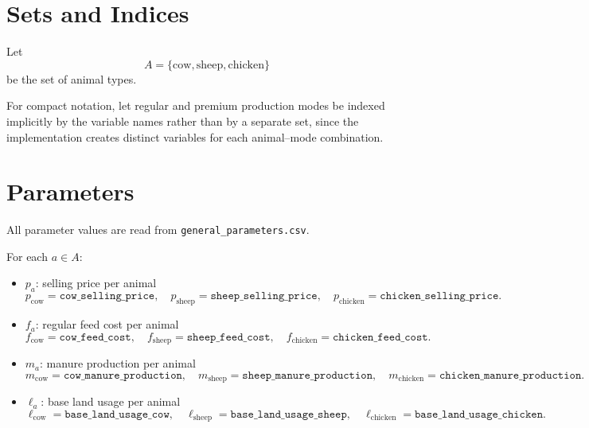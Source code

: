 \section*{Sets and Indices}

Let
\[
A=\{\mathrm{cow},\mathrm{sheep},\mathrm{chicken}\}
\]
be the set of animal types.

For compact notation, let regular and premium production modes be indexed implicitly by the variable names rather than by a separate set, since the implementation creates distinct variables for each animal--mode combination.

\section*{Parameters}

All parameter values are read from \texttt{general\_parameters.csv}.

For each \(a\in A\):
\begin{itemize}
    \item \(p_a\): selling price per animal
    \[
    p_{\mathrm{cow}}=\texttt{cow\_selling\_price},\quad
    p_{\mathrm{sheep}}=\texttt{sheep\_selling\_price},\quad
    p_{\mathrm{chicken}}=\texttt{chicken\_selling\_price}.
    \]
    \item \(f_a\): regular feed cost per animal
    \[
    f_{\mathrm{cow}}=\texttt{cow\_feed\_cost},\quad
    f_{\mathrm{sheep}}=\texttt{sheep\_feed\_cost},\quad
    f_{\mathrm{chicken}}=\texttt{chicken\_feed\_cost}.
    \]
    \item \(m_a\): manure production per animal
    \[
    m_{\mathrm{cow}}=\texttt{cow\_manure\_production},\quad
    m_{\mathrm{sheep}}=\texttt{sheep\_manure\_production},\quad
    m_{\mathrm{chicken}}=\texttt{chicken\_manure\_production}.
    \]
    \item \(\ell_a\): base land usage per animal
    \[
    \ell_{\mathrm{cow}}=\texttt{base\_land\_usage\_cow},\quad
    \ell_{\mathrm{sheep}}=\texttt{base\_land\_usage\_sheep},\quad
    \ell_{\mathrm{chicken}}=\texttt{base\_land\_usage\_chicken}.
    \]
\end{itemize}


